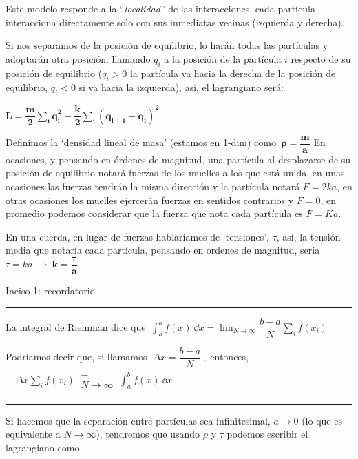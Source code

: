 Este modelo responde a la ``\emph{localidad}'' de las interacciones, cada partícula interacciona directamente solo con sus inmediatas vecinas (izquierda y derecha).

Si nos separamos de la posición de equilibrio, lo harán todas las partículas y adoptarán otra posición. llamando $q_i$ a la posición de la partícula $i$ respecto de su posición de equilibrio ($q_i>0$ la partícula va hacia la derecha de la posición de equilibrio, $q_i<0$ si va hacia la izquierda), así, el lagrangiano será:

$\boldsymbol{ L=\dfrac m 2 \displaystyle \sum_i \dot q_i^2 - \dfrac k 2 \sum_i (q_{i+1}-q_i)^2 }$

Definimos la `densidad lineal de masa' (estamos en 1-dim) como $\ \boldsymbol{\rho=\dfrac m a}$ En ocasiones, y pensando en órdenes de magnitud, una partícula al desplazarse de su posición de equilibrio notará fuerzas de los muelles a los que está unida, en unas ocasiones las fuerzas tendrán la misma dirección y la partícula notará $F=2ka$, en otras ocasiones los muelles ejercerán fuerzas en sentidos contrarios y $F=0$, en promedio podemos considerar que la fuerza que nota cada partícula es $F=Ka$. 

En una cuerda, en lugar de fuerzas hablaríamos de `tensiones', $\tau$, así, la tensión media que notaría cada partícula, pensando en ordenes de magnitud, sería $\tau=ka \ \to \ \boldsymbol{ k=\dfrac \tau a}$


\vspace{5mm}

Inciso-1: recordatorio $\quad$ \rule{200pt}{0.1pt}

La integral de Riemman dice que $\ \displaystyle \int_a^b f(x)\ \dd x=\lim_{N\to \infty} \dfrac{b-a}{N} \sum_i f(x_i)$

Podríamos decir que, si llamamos $\ \Delta x=\dfrac{b-a}N\, , $ entonces, 
$\quad \displaystyle \Delta x \sum_i f(x_i) \ \begin{matrix} \\=\\ N\to \infty  \\ \end{matrix} \ \int_a^b f(x) \ \dd x$

\vspace{-5mm}\begin{flushright}\rule{200pt}{0.1pt}\end{flushright}

Si hacemos que la separación entre partículas sea infinitesimal, $a\to 0$ (lo que es equivalente a $N\to \infty$), tendremos que usando $\rho$ y $\tau$ podemos escribir el lagrangiano como

